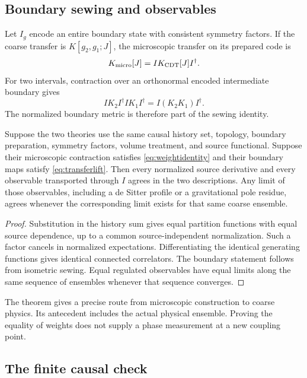 \subsection{Boundary sewing and observables}

Let $I_g$ encode an entire boundary state with consistent symmetry factors. If the coarse transfer is $K[g_2,g_1;J]$, the microscopic transfer on its prepared code is
\begin{equation}
K_{\rm micro}[J]=I K_{\rm CDT}[J]I^\dagger.
\label{eq:transferlift}
\end{equation}
For two intervals, contraction over an orthonormal encoded intermediate boundary gives
\begin{equation}
IK_2I^\dagger IK_1I^\dagger=I(K_2K_1)I^\dagger.
\end{equation}
The normalized boundary metric is therefore part of the sewing identity.

\begin{theorem}
\label{thm:inherit}
Suppose the two theories use the same causal history set, topology, boundary preparation, symmetry factors, volume treatment, and source functional. Suppose their microscopic contraction satisfies \eqref{eq:weightidentity} and their boundary maps satisfy \eqref{eq:transferlift}. Then every normalized source derivative and every observable transported through $I$ agrees in the two descriptions. Any limit of those observables, including a de Sitter profile or a gravitational pole residue, agrees whenever the corresponding limit exists for that same coarse ensemble.
\end{theorem}
\begin{proof}
Substitution in the history sum gives equal partition functions with equal source dependence, up to a common source-independent normalization. Such a factor cancels in normalized expectations. Differentiating the identical generating functions gives identical connected correlators. The boundary statement follows from isometric sewing. Equal regulated observables have equal limits along the same sequence of ensembles whenever that sequence converges.
\end{proof}

The theorem gives a precise route from microscopic construction to coarse physics. Its antecedent includes the actual physical ensemble. Proving the equality of weights does not supply a phase measurement at a new coupling point.

\subsection{The finite causal check}

